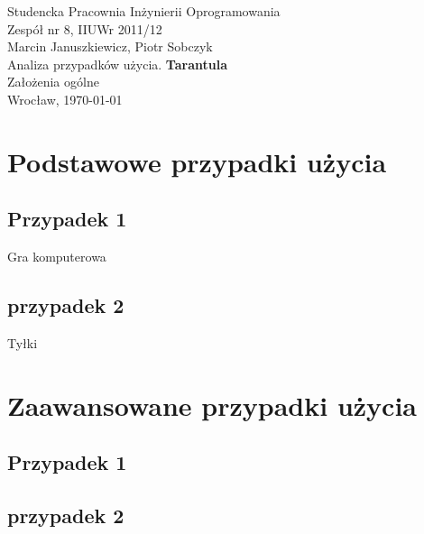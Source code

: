 \documentclass[11pt,leqno]{article}
\begin{document}
\begin{center}
\thispagestyle{empty}
{\Large Studencka Pracownia Inżynierii Oprogramowania}\\[0.5cm]
{\Large Zespół nr 8, IIUWr 2011/12}\\[2.5cm]

{\large Marcin Januszkiewicz, Piotr Sobczyk}\\[0.5cm]
{\huge Analiza przypadków użycia. \textbf{Tarantula}}\\[0.5cm]
{\huge Założenia ogólne}\\[0.5cm]
\vfill
{\large Wrocław, \today}
\end{center}
\newpage
\tableofcontents

\newpage


\newpage

\section{Podstawowe przypadki użycia}

\subsection{Przypadek 1}
Gra komputerowa
\subsection{przypadek 2}
Tyłki
\section{Zaawansowane przypadki użycia}

\subsection{Przypadek 1}

\subsection{przypadek 2}
\end{document}
